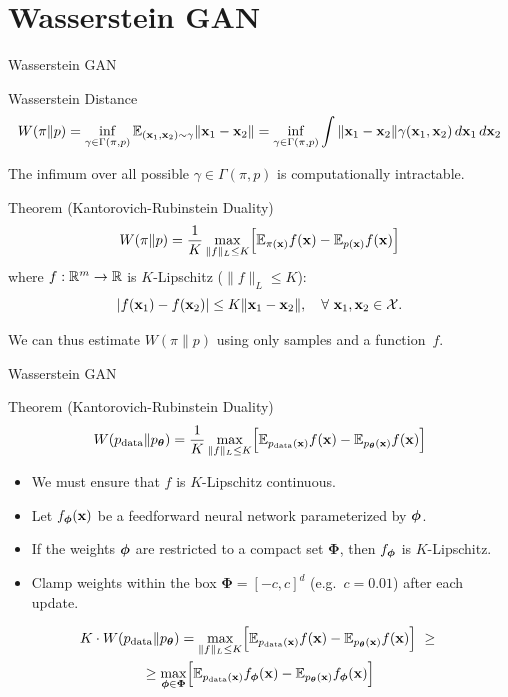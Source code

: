 \documentclass{beamer}
\begin{document}
\section{Wasserstein GAN}
\begin{frame}{Wasserstein GAN}
	\begin{block}{Wasserstein Distance}
		\vspace{-0.5cm}
		\small
		\[
		W(\pi \| p) = \inf_{\gamma \in \Gamma(\pi, p)} \mathbb{E}_{(\mathbf{x}_1, \mathbf{x}_2) \sim \gamma} \| \mathbf{x}_1 - \mathbf{x}_2 \| =  \inf_{\gamma \in \Gamma(\pi, p)} \int \|\mathbf{x}_1 - \mathbf{x}_2\| \gamma (\mathbf{x}_1, \mathbf{x}_2)\, d\mathbf{x}_1\, d\mathbf{x}_2
		\]
		\vspace{-0.3cm}
	\end{block}
	\eqpause
	The infimum over all possible $\gamma \in \Gamma(\pi, p)$ is computationally intractable.
	\eqpause
	\begin{block}{Theorem (Kantorovich-Rubinstein Duality)}
		\vspace{-0.3cm}
		\[
			W(\pi \| p) = \frac{1}{K} \max_{\| f \|_L \leq K} \Bigl[ \mathbb{E}_{\pi(\mathbf{x})} f(\mathbf{x})  - \mathbb{E}_{p(\mathbf{x})} f(\mathbf{x})\Bigr]
		\]
		where $f : \mathbb{R}^m \rightarrow \mathbb{R}$ is $K$-Lipschitz ($\|f\|_L \leq K$):
		\[
			|f(\mathbf{x}_1) - f(\mathbf{x}_2)| \leq K \|\mathbf{x}_1 - \mathbf{x}_2\|,\quad \forall\ \mathbf{x}_1, \mathbf{x}_2 \in \mathcal{X}.
		\]
		\vspace{-0.6cm}
	\end{block}
	\eqpause
	We can thus estimate $W(\pi \| p)$ using only samples and a function~$f$.
\end{frame}
\begin{frame}{Wasserstein GAN}
	\begin{block}{Theorem (Kantorovich-Rubinstein Duality)}
		\[
		W(p_{\text{data}} \| p_{\boldsymbol{\theta}}) = \frac{1}{K} \max_{\| f \|_L \leq K} \Bigl[ \mathbb{E}_{p_{\text{data}}(\mathbf{x})} f(\mathbf{x})  - \mathbb{E}_{p_{\boldsymbol{\theta}}(\mathbf{x})} f(\mathbf{x})\Bigr]
		\]
	\end{block}
	\begin{itemize}
		\item We must ensure that $f$ is $K$-Lipschitz continuous.
		\item Let $f_{\boldsymbol{\phi}}(\mathbf{x})$ be a feedforward neural network parameterized by $\boldsymbol{\phi}$.
		\item If the weights $\boldsymbol{\phi}$ are restricted to a compact set $\boldsymbol{\Phi}$, then $f_{\boldsymbol{\phi}}$ is $K$-Lipschitz.
		\eqpause
		\item Clamp weights within the box $\boldsymbol{\Phi} = [-c, c]^d$ (e.g.\ $c = 0.01$) after each update.
	\end{itemize}
	\begin{multline*}
		K \cdot W(\pd \| \pt) = \max_{\| f \|_L \leq K} \Bigl[ \bbE_{\pd(\bx)} f(\bx)  - \bbE_{\pt(\bx)} f(\bx)\Bigr]\ \geq\ 
		\\  \geq \max_{\bphi \in \boldsymbol{\Phi}} \Bigl[ \bbE_{\pd(\bx)} f_{\bphi}(\bx)  - \bbE_{\pt(\bx)} f_{\bphi}(\bx)\Bigr]
	\end{multline*}
\end{frame}
\end{document}
